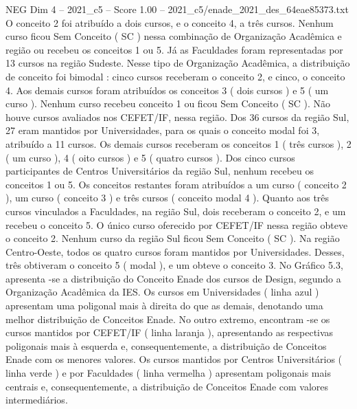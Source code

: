 \begin{textsample}{NEG Dim 4 – 2021\_c5 – Score 1.00 – 2021\_c5/enade\_2021\_des\_64eae85373.txt}
O conceito 2 foi atribuído a dois cursos, e o conceito 4, a três cursos.
Nenhum curso ficou Sem Conceito ( SC ) nessa combinação de Organização Acadêmica e região ou recebeu os conceitos 1 ou 5.
Já as Faculdades foram representadas por 13 cursos na região Sudeste.
Nesse tipo de Organização Acadêmica, a distribuição de conceito foi bimodal : cinco cursos receberam o conceito 2, e cinco, o conceito 4.
Aos demais cursos foram atribuídos os conceitos 3 ( dois cursos ) e 5 ( um curso ).
Nenhum curso recebeu conceito 1 ou ficou Sem Conceito ( SC ).
Não houve cursos avaliados nos CEFET/IF, nessa região.
Dos 36 cursos da região Sul, 27 eram mantidos por Universidades, para os quais o conceito modal foi 3, atribuído a 11 cursos.
Os demais cursos receberam os conceitos 1 ( três cursos ), 2 ( um curso ), 4 ( oito cursos ) e 5 ( quatro cursos ).
Dos cinco cursos participantes de Centros Universitários da região Sul, nenhum recebeu os conceitos 1 ou 5.
Os conceitos restantes foram atribuídos a um curso ( conceito 2 ), um curso ( conceito 3 ) e três cursos ( conceito modal 4 ).
Quanto aos três cursos vinculados a Faculdades, na região Sul, dois receberam o conceito 2, e um recebeu o conceito 5.
O único curso oferecido por CEFET/IF nessa região obteve o conceito 2.
Nenhum curso da região Sul ficou Sem Conceito ( SC ).
Na região Centro-Oeste, todos os quatro cursos foram mantidos por Universidades.
Desses, três obtiveram o conceito 5 ( modal ), e um obteve o conceito 3.
No Gráfico 5.3, apresenta -se a distribuição do Conceito Enade dos cursos de Design, segundo a Organização Acadêmica da IES.
Os cursos em Universidades ( linha azul ) apresentam uma poligonal mais à direita do que as demais, denotando uma melhor distribuição de Conceitos Enade.
No outro extremo, encontram -se os cursos mantidos por CEFET/IF ( linha laranja ), apresentando as respectivas poligonais mais à esquerda e, consequentemente, a distribuição de Conceitos Enade com os menores valores.
Os cursos mantidos por Centros Universitários ( linha verde ) e por Faculdades ( linha vermelha ) apresentam poligonais mais centrais e, consequentemente, a distribuição de Conceitos Enade com valores intermediários.

\end{textsample}
